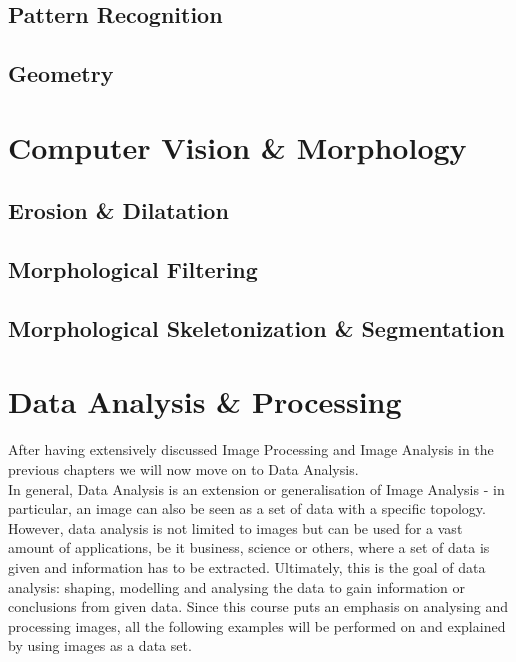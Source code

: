 \subsection{Pattern Recognition}

\subsection{Geometry}


\section{Computer Vision \& Morphology}

\subsection{Erosion \& Dilatation}

\subsection{Morphological Filtering}

\subsection{Morphological Skeletonization \& Segmentation}


\section{Data Analysis \& Processing}
After having extensively discussed Image Processing and Image Analysis in the previous chapters we will now move on to Data Analysis. \\In general, Data Analysis is an extension or generalisation of Image Analysis - in particular, an image can also be seen as a set of data with a specific topology. However, data analysis is not limited to images but can be used for a vast amount of applications, be it business, science or others, where a set of data is given and information has to be extracted. Ultimately, this is the goal of data analysis: shaping, modelling and analysing the data to gain information or conclusions from given data.
Since this course puts an emphasis on analysing and processing images, all the following examples will be performed on and explained by using images as a data set.

